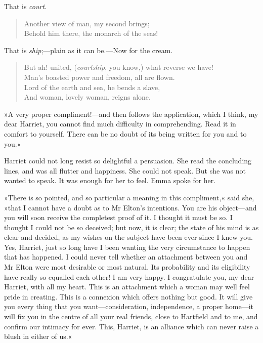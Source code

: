 That is \textit{court}.

\begin{verse}
\begin{altverse}
Another view of man, my second brings;\\
    Behold him there, the monarch of the seas!
	\end{altverse}
\end{verse}

That is \textit{ship};—plain as it can be.—Now for the cream.

\begin{verse}
\begin{altverse}
But ah! united, (\textit{courtship}, you know,) what reverse we have!\\
    Man's boasted power and freedom, all are flown.\\
Lord of the earth and sea, he bends a slave,\\
    And woman, lovely woman, reigns alone.\\
	
	\end{altverse}
\end{verse}

»A very proper compliment!—and then follows the application, which I think, my dear Harriet, you cannot find much difficulty in comprehending. Read it in comfort to yourself. There can be no doubt of its being written for you and to you.«

Harriet could not long resist so delightful a persuasion. She read the concluding lines, and was all flutter and happiness. She could not speak. But she was not wanted to speak. It was enough for her to feel. Emma spoke for her.

»There is so pointed, and so particular a meaning in this compliment,« said she, »that I cannot have a doubt as to Mr Elton's intentions. You are his object—and you will soon receive the completest proof of it. I thought it must be so. I thought I could not be so deceived; but now, it is clear; the state of his mind is as clear and decided, as my wishes on the subject have been ever since I knew you. Yes, Harriet, just so long have I been wanting the very circumstance to happen that has happened. I could never tell whether an attachment between you and Mr Elton were most desirable or most natural. Its probability and its eligibility have really so equalled each other! I am very happy. I congratulate you, my dear Harriet, with all my heart. This is an attachment which a woman may well feel pride in creating. This is a connexion which offers nothing but good. It will give you every thing that you want—consideration, independence, a proper home—it will fix you in the centre of all your real friends, close to Hartfield and to me, and confirm our intimacy for ever. This, Harriet, is an alliance which can never raise a blush in either of us.«

